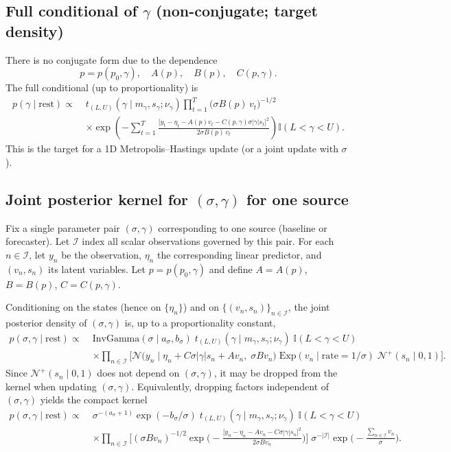 \documentclass[11pt]{article}
\newcommand{\1}{\mathbb{I}}
\newcommand{\N}{\mathcal{N}}
\newcommand{\IG}{\mathrm{InvGamma}}
\newcommand{\Exp}{\mathrm{Exp}}
\begin{document}
\subsection{Full conditional of \texorpdfstring{$\gamma$}{gamma} (non-conjugate; target density)}

There is no conjugate form due to the dependence
\[
p=p(p_0,\gamma),\quad A(p),\quad B(p),\quad C(p,\gamma).
\]
The full conditional (up to proportionality) is
\begin{align}
p(\gamma\mid \text{rest})
\propto\;&
t_{(L,U)}(\gamma\mid m_\gamma,s_\gamma;\nu_\gamma)
\prod_{t=1}^T \Big(\sigma B(p)\,v_t\Big)^{-1/2}\nonumber\\
&\times \exp\!\left(
-\sum_{t=1}^T
\frac{\big[y_t-\eta_t-A(p)v_t-C(p,\gamma)\sigma|\gamma|s_t\big]^2}{2\sigma B(p)\,v_t}
\right)\1(L<\gamma<U).\label{eq:cond_gamma}
\end{align}
This is the target for a 1D Metropolis--Hastings update (or a joint update with $\sigma$).

\subsection{Joint posterior kernel for \texorpdfstring{$(\sigma,\gamma)$}{(sigma,gamma)} for one source}

Fix a single parameter pair $(\sigma,\gamma)$ corresponding to one source (baseline or forecaster).
Let $\mathcal{I}$ index all scalar observations governed by this pair.
For each $n\in\mathcal{I}$, let $y_n$ be the observation, $\eta_n$ the corresponding linear predictor, and $(v_n,s_n)$ its latent variables.
Let $p=p(p_0,\gamma)$ and define $A=A(p)$, $B=B(p)$, $C=C(p,\gamma)$.

Conditioning on the states (hence on $\{\eta_n\}$) and on $\{(v_n,s_n)\}_{n\in\mathcal{I}}$, the joint posterior density of $(\sigma,\gamma)$ is, up to a proportionality constant,
\begin{align}
p(\sigma,\gamma \mid \text{rest})
\propto\;&
\IG(\sigma\mid a_\sigma,b_\sigma)\;
t_{(L,U)}(\gamma\mid m_\gamma,s_\gamma;\nu_\gamma)\;\1(L<\gamma<U)\nonumber\\
&\times \prod_{n\in\mathcal{I}}
\Big[
\N\!\big(y_n\mid \eta_n + C\sigma|\gamma|s_n + Av_n,\;\sigma B v_n\big)\;
\Exp(v_n\mid \text{rate}=1/\sigma)\;
\N^+(s_n\mid 0,1)
\Big]. \label{eq:joint_sigmagamma}
\end{align}
Since $\N^+(s_n\mid 0,1)$ does not depend on $(\sigma,\gamma)$, it may be dropped from the kernel when updating $(\sigma,\gamma)$.
Equivalently, dropping factors independent of $(\sigma,\gamma)$ yields the compact kernel
\begin{align}
p(\sigma,\gamma \mid \text{rest})
\propto\;&
\sigma^{-(a_\sigma+1)}\exp(-b_\sigma/\sigma)\;
t_{(L,U)}(\gamma\mid m_\gamma,s_\gamma;\nu_\gamma)\;\1(L<\gamma<U)\nonumber\\
&\times \prod_{n\in\mathcal{I}}
\Big[(\sigma B v_n)^{-1/2}\exp\!\Big(-\frac{\big[y_n-\eta_n-Av_n-C\sigma|\gamma|s_n\big]^2}{2\sigma B v_n}\Big)\Big]\;
\sigma^{-|\mathcal{I}|}\exp\!\Big(-\frac{\sum_{n\in\mathcal{I}} v_n}{\sigma}\Big). \label{eq:joint_sigmagamma_kernel}
\end{align}
\end{document}
